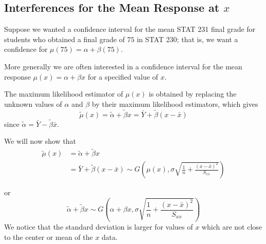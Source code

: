 \documentclass[oneside]{book}
\begin{document}
\subsection{Interferences for the Mean Response at $ x $}
Suppose we wanted a confidence interval for the mean STAT 231 final grade for students
who obtained a final grade of $ 75 $ in STAT 230; that is, we want a confidence
for $ \mu(75)=\alpha+\beta(75) $.

More generally we are often interested in a confidence interval for the mean
response $ \mu(x)=\alpha+\beta x $ for a specified value of $ x $.

The maximum likelihood estimator of $ \mu(x) $ is obtained by replacing the unknown
values of $ \alpha $ and $ \beta $ by their maximum likelihood estimators,
which gives
\[\tilde{\mu}(x)
    =\tilde{\alpha}+\tilde{\beta} x
    =\bar{Y}+\tilde{\beta}(x-\bar{x})\]
since $ \tilde{\alpha}=\bar{Y}-\tilde{\beta}\bar{x} $.

We will now show that
\[
    \begin{aligned}
        \tilde{\mu}(x)
         & =\tilde{\alpha}+\tilde{\beta}x                                      \\
         & =\bar{Y}+\tilde{\beta}\left( x-\bar{x} \right) \sim G\left( \mu(x),
        \sigma \sqrt{\frac{1}{n}+\frac{\left( x-\bar{x} \right)^2}{S_{xx}}} \right)
    \end{aligned}
\]

or
\[\tilde{\alpha}+\tilde{\beta} x \sim G\left(\alpha+\beta x,
    \sigma \sqrt{\frac{1}{n}+\frac{(x-\bar{x})^{2}}{S_{x x}}}\right)\]
We notice that the standard deviation is larger for values
of $ x $ which are not close to the center or mean of the $ x $ data.
\end{document}
